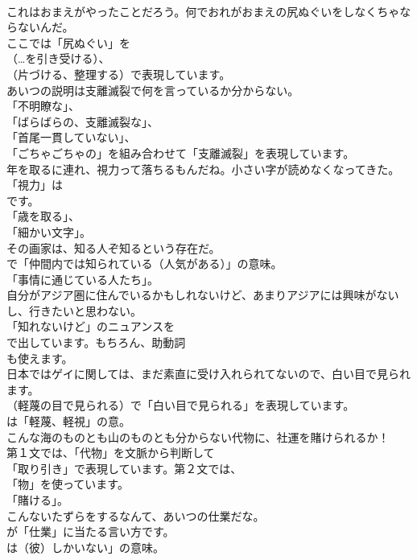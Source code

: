 \documentclass[8pt]{extreport}
\begin{document}
\begin{CJK}{UTF8}{min}
\\	これはおまえがやったことだろう。何でおれがおまえの尻ぬぐいをしなくちゃならないんだ。 
\\	ここでは「尻ぬぐい」を 
\\	（…を引き受ける）、
\\	（片づける、整理する）で表現しています。	
\\	あいつの説明は支離滅裂で何を言っているか分からない。 
\\	「不明瞭な」、
\\	「ばらばらの、支離滅裂な」、
\\	「首尾一貫していない」、
\\	「ごちゃごちゃの」を組み合わせて「支離滅裂」を表現しています。	
\\	年を取るに連れ、視力って落ちるもんだね。小さい字が読めなくなってきた。 
\\	「視力」は
\\	です。
\\	「歳を取る」、
\\	「細かい文字」。	
\\	その画家は、知る人ぞ知るという存在だ。 
\\	で「仲間内では知られている（人気がある）」の意味。
\\	「事情に通じている人たち」。	
\\	自分がアジア圏に住んでいるかもしれないけど、あまりアジアには興味がないし、行きたいと思わない。 
\\	「知れないけど」のニュアンスを
\\	で出しています。もちろん、助動詞
\\	も使えます。	
\\	日本ではゲイに関しては、まだ素直に受け入れられてないので、白い目で見られます。 
\\	（軽蔑の目で見られる）で「白い目で見られる」を表現しています。
\\	は「軽蔑、軽視」の意。	
\\	こんな海のものとも山のものとも分からない代物に、社運を賭けられるか！ 
\\	第１文では、「代物」を文脈から判断して
\\	「取り引き」で表現しています。第２文では、
\\	「物」を使っています。
\\	「賭ける」。	
\\	こんないたずらをするなんて、あいつの仕業だな。 
\\	が「仕業」に当たる言い方です。
\\	は（彼）しかいない」の意味。	

\end{CJK}
\end{document}
